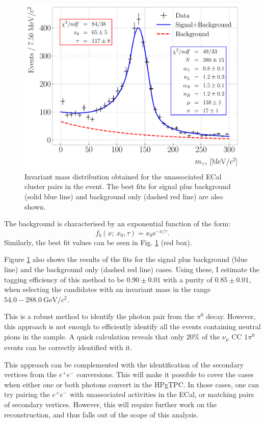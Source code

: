 \begin{figure}[t]
    \centering
    \includegraphics[width=.80\linewidth]{Images/GAr_selection/numuCC_1pizero_selection.pdf}
    \caption[Invariant mass distribution obtained for the unassociated ECal cluster pairs in the event.]{Invariant mass distribution obtained for the unassociated ECal cluster pairs in the event. The best fits for signal plus background (solid blue line) and background only (dashed red line) are also shown.}
    \label{fig:pizero_invariant_mass}
\end{figure}

The background is characterised by an exponential function of the form:
\begin{equation}
    f_{b} (x; ~x_{0}, \tau) = x_{0} \mathrm{e}^{-x/\tau}.
\end{equation}
Similarly, the best fit values can be seen in Fig. \ref{fig:pizero_invariant_mass} (red box).

Figure \ref{fig:pizero_invariant_mass} also shows the results of the fits for the signal plus background (blue line) and the background only (dashed red line) cases. Using these, I estimate the tagging efficiency of this method to be $0.90 \pm 0.01$ with a purity of $0.85 \pm 0.01$, when selecting the candidates with an invariant mass in the range $54.0-288.0~\mathrm{GeV}/c^{2}$.

This is a robust method to identify the photon pair from the $\pi^{0}$ decay. However, this approach is not enough to efficiently identify all the events containing neutral pions in the sample. A quick calculation reveals that only $20\%$ of the $\nu_{\mu}$ CC $1\pi^{0}$ events can be correctly identified with it.

This approach can be complemented with the identification of the secondary vertices from the $e^{+}e^{-}$ conversions. This will make it possible to cover the cases when either one or both photons convert in the HPgTPC. In those cases, one can try pairing the $e^{+}e^{-}$ with unassociated activities in the ECal, or matching pairs of secondary vertices. However, this will require further work on the reconstruction, and thus falls out of the scope of this analysis.

